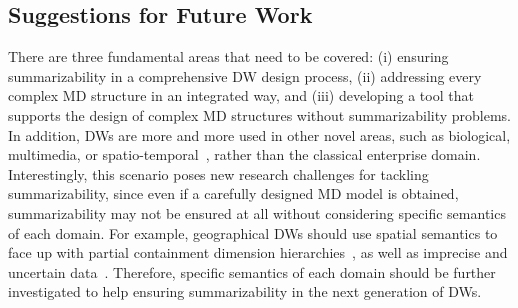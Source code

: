 \subsection{Suggestions for Future Work}
There are three fundamental areas that need to be covered: (i)
ensuring summarizability in a comprehensive DW design process, (ii)
addressing every complex MD structure in an integrated way, and
(iii) developing a tool that supports the design of complex MD
structures without summarizability problems. In addition, DWs are
more and more used in other novel areas, such as biological,
multimedia, or spatio-temporal~\cite{DBLP:conf/dolap/RizziALT06},
rather than the classical enterprise domain. Interestingly, this
scenario poses new research challenges for tackling summarizability,
since even if a carefully designed MD model is obtained,
summarizability may not be ensured at all without considering
specific semantics of each domain. For example, geographical DWs
should use spatial semantics to face up with partial containment
dimension hierarchies~\cite{DBLP:journals/vldb/JensenKPT04}, as well
as imprecise and uncertain
data~\cite{DBLP:journals/vldb/BurdickDJRV07}. Therefore, specific
semantics of each domain should be further investigated to help
ensuring summarizability in the next generation of DWs.



